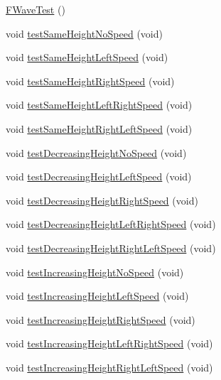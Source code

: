 \begin{DoxyCompactItemize}
\item 
\hyperlink{classFWaveTest_a637e3a21850ed7432394b19d1f8320d1}{F\+Wave\+Test} ()
\item 
void \hyperlink{classFWaveTest_aad1779e385672a5fcea0fb09cbd8a2f0}{test\+Same\+Height\+No\+Speed} (void)
\item 
void \hyperlink{classFWaveTest_aed2db9d70b98e7b7924fcb8705bbf509}{test\+Same\+Height\+Left\+Speed} (void)
\item 
void \hyperlink{classFWaveTest_a4cffba9a84aeb963b6b8d4ac79efe227}{test\+Same\+Height\+Right\+Speed} (void)
\item 
void \hyperlink{classFWaveTest_a284fbedaff0f4e2a98ec868926176773}{test\+Same\+Height\+Left\+Right\+Speed} (void)
\item 
void \hyperlink{classFWaveTest_a5ceb6cf106458f0a0110ac13fe2c3f35}{test\+Same\+Height\+Right\+Left\+Speed} (void)
\item 
void \hyperlink{classFWaveTest_abf28f88dc07c66d8ccd7541a2fc9b901}{test\+Decreasing\+Height\+No\+Speed} (void)
\item 
void \hyperlink{classFWaveTest_a817892593d58cf1dad61a2abb0810378}{test\+Decreasing\+Height\+Left\+Speed} (void)
\item 
void \hyperlink{classFWaveTest_aaae1f57e2ef62d53bff1169d84aa7059}{test\+Decreasing\+Height\+Right\+Speed} (void)
\item 
void \hyperlink{classFWaveTest_a2dc496f15de60f5d199d6b1a35b596f3}{test\+Decreasing\+Height\+Left\+Right\+Speed} (void)
\item 
void \hyperlink{classFWaveTest_a24b35d3400c5ee91be94bf7ba47e82bf}{test\+Decreasing\+Height\+Right\+Left\+Speed} (void)
\item 
void \hyperlink{classFWaveTest_abd75e73da77f86f5145dd9ed1796f0fc}{test\+Increasing\+Height\+No\+Speed} (void)
\item 
void \hyperlink{classFWaveTest_aa6a036225ee4f6a00d40ba439899933d}{test\+Increasing\+Height\+Left\+Speed} (void)
\item 
void \hyperlink{classFWaveTest_a3e4e03f910ee006e0dce95cb2276a76a}{test\+Increasing\+Height\+Right\+Speed} (void)
\item 
void \hyperlink{classFWaveTest_a57b9d687f5a7311739883c9931d1e301}{test\+Increasing\+Height\+Left\+Right\+Speed} (void)
\item 
void \hyperlink{classFWaveTest_aaf371e755b499555a6daf142c9e5173f}{test\+Increasing\+Height\+Right\+Left\+Speed} (void)
\end{DoxyCompactItemize}
